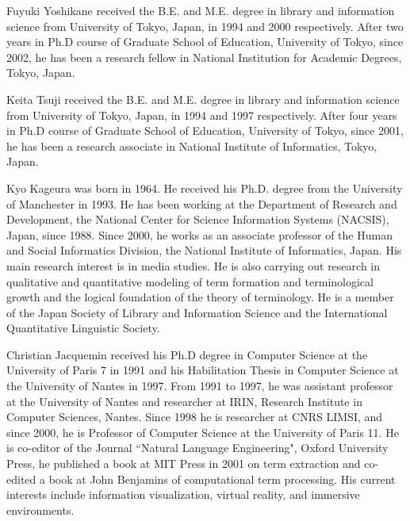 \begin{biography}

\biotitle{}

{
Fuyuki Yoshikane received the B.E. and M.E. degree in library and information science from University of Tokyo, Japan, in 1994 and 2000 respectively. After two years in Ph.D course of Graduate School of Education, University of Tokyo, since 2002, he has been a research fellow in National Institution for Academic Degrees, Tokyo, Japan.
}

{
Keita Tsuji received the B.E. and M.E. degree in library and information science from University of Tokyo, Japan, in 1994 and 1997 respectively. After four years in Ph.D course of Graduate School of Education, University of Tokyo, since 2001, he has been a research associate in National Institute of Informatics, Tokyo, Japan.
}

{
Kyo Kageura was born in 1964. He received his Ph.D. degree from the University of Manchester in 1993. He has been working at the Department of Research and Development, the National Center for Science Information Systems (NACSIS), Japan, since 1988. Since 2000, he works as an associate professor of the Human and Social Informatics Division, the National Institute of Informatics, Japan. His main research interest is in media studies. He is also carrying out research in qualitative and quantitative modeling of term formation and terminological growth and the logical foundation of the theory of terminology. He is a member of the Japan Society of Library and Information Science and the International Quantitative Linguistic Society.
}

{
Christian Jacquemin received his Ph.D degree in Computer Science at the University of Paris 7 in 1991 and his Habilitation Thesis in Computer Science at the University of Nantes in 1997. From 1991 to 1997, he was assistant professor at the University of Nantes and researcher at IRIN, Research Institute in Computer Sciences, Nantes. Since 1998 he is researcher at CNRS LIMSI, and since 2000, he is Professor of Computer Science at the University of Paris 11. He is co-editor of the Journal ``Natural Language Engineering", Oxford University Press, he published a book at MIT Press in 2001 on term extraction and co-edited a book at John Benjamins of computational term processing. His current interests include information visualization, virtual reality, and immersive environments.
}

\end{biography}



